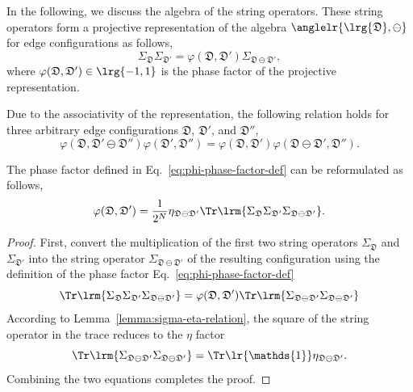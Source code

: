 In the following, we discuss the algebra of the string operators. These string operators form a projective representation of the algebra $\anglelr{\lrg{\mathfrak{D}}, \ominus}$ for edge configurations as follows,
\begin{equation}\label{eq:phi-phase-factor-def}
  \Sigma_{\mathfrak{D}}\Sigma_{\mathfrak{D}'} = \varphi(\mathfrak{D},\mathfrak{D}') \Sigma_{\mathfrak{D}\ominus\mathfrak{D}'},
\end{equation}
where $\varphi(\mathfrak{D},\mathfrak{D}')\in\lrg{-1,1}$ is the phase factor of the projective representation. 
\begin{theorem}\label{cor:phase-associativity}
  Due to the associativity of the representation, the following relation holds for three arbitrary edge configurations $\mathfrak{D}$, $\mathfrak{D}'$, and $\mathfrak{D}''$,
\[
\varphi(\mathfrak{D},\mathfrak{D}'\ominus\mathfrak{D}'')\varphi(\mathfrak{D}',\mathfrak{D}'') = 
\varphi(\mathfrak{D},\mathfrak{D}')\varphi(\mathfrak{D}\ominus\mathfrak{D}',\mathfrak{D}'').
\]
\end{theorem}

\begin{theorem}\label{thm:phi-operational-def}
The phase factor defined in Eq.~\eqref{eq:phi-phase-factor-def} can be reformulated as follows,
\[
\varphi(\mathfrak{D},\mathfrak{D}') = \frac{1}{2^{N}}\eta_{\mathfrak{D}\ominus\mathfrak{D}'}\Tr\lrm{\Sigma_{\mathfrak{D}}\Sigma_{\mathfrak{D}'}\Sigma_{\mathfrak{D}\ominus\mathfrak{D}'}}.
\]
\end{theorem}
\begin{proof}
First, convert the multiplication of the first two string operators $\Sigma_\mathfrak{D}$ and $\Sigma_{\mathfrak{D}'}$ into the string operator $\Sigma_{\mathfrak{D}\ominus\mathfrak{D}'}$ of the resulting configuration using the definition of the phase factor Eq.~\eqref{eq:phi-phase-factor-def}
\[
\Tr\lrm{\Sigma_{\mathfrak{D}}\Sigma_{\mathfrak{D}'}\Sigma_{\mathfrak{D}\ominus\mathfrak{D}'}}
= \varphi(\mathfrak{D},\mathfrak{D}')\Tr\lrm{\Sigma_{\mathfrak{D}\ominus\mathfrak{D}'}\Sigma_{\mathfrak{D}\ominus\mathfrak{D}'}}
\]
According to Lemma~\ref{lemma:sigma-eta-relation}, the square of the string operator in the trace reduces to the $\eta$ factor
\[
\Tr\lrm{\Sigma_{\mathfrak{D}\ominus\mathfrak{D}'}\Sigma_{\mathfrak{D}\ominus\mathfrak{D}'}}
=
\Tr\lr{\mathds{1}}\eta_{\mathfrak{D}\ominus\mathfrak{D}'}.
\]
Combining the two equations completes the proof.
\end{proof}

